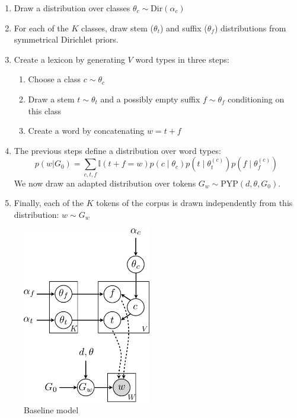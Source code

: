 \documentclass{article}
\begin{document}
\begin{enumerate}
    \item Draw a distribution over classes $\theta_c \sim \text{Dir}(\alpha_c)$
    \item For each of the $K$ classes, draw stem ($\theta_t$) and suffix ($\theta_f$) distributions from symmetrical Dirichlet priors.
    \item Create a lexicon by generating $V$ word types in three steps:
        \begin{enumerate}
            \item Choose a class $c \sim \theta_c$
            \item Draw a stem $t \sim \theta_t$ and a possibly empty suffix $f \sim \theta_f$ conditioning on this class
            \item Create a word by concatenating $w = t+f$
        \end{enumerate}
    \item The previous steps define a distribution over word types:
        $$p(w|G_0) = \sum_{c,t,f} \mathbb{I}(t+f = w) p(c \mid \theta_c) p(t \mid \theta_t^{(c)}) p(f \mid \theta_f^{(c)})$$
        We now draw an adapted distribution over tokens $G_w \sim \text{PYP}(d, \theta, G_0)$.
    \item Finally, each of the $K$ tokens of the corpus is drawn independently from this distribution: $w \sim G_w$
\end{enumerate}

\begin{figure}[h]
\centering
\includegraphics[width=0.5\textwidth]{fig/graph-model}
\caption{Baseline model}
\label{fig:graph-model}
\end{figure}
\end{document}
